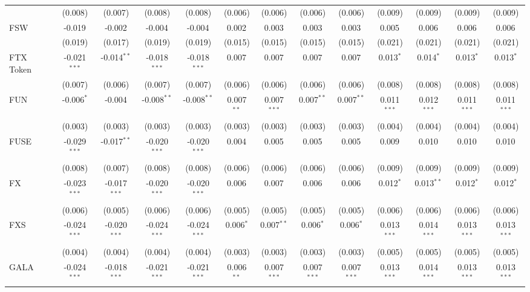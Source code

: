 \begin{table}[!htbp]
\begin{tabular}{@{\extracolsep{5pt}}lcccccccccccc}
  & (0.008) & (0.007) & (0.008) & (0.008) & (0.006) & (0.006) & (0.006) & (0.006) & (0.009) & (0.009) & (0.009) & (0.009) \\
 FSW & -0.019$^{}$ & -0.002$^{}$ & -0.004$^{}$ & -0.004$^{}$ & 0.002$^{}$ & 0.003$^{}$ & 0.003$^{}$ & 0.003$^{}$ & 0.005$^{}$ & 0.006$^{}$ & 0.006$^{}$ & 0.006$^{}$ \\
  & (0.019) & (0.017) & (0.019) & (0.019) & (0.015) & (0.015) & (0.015) & (0.015) & (0.021) & (0.021) & (0.021) & (0.021) \\
 FTX Token & -0.021$^{***}$ & -0.014$^{**}$ & -0.018$^{***}$ & -0.018$^{***}$ & 0.007$^{}$ & 0.007$^{}$ & 0.007$^{}$ & 0.007$^{}$ & 0.013$^{*}$ & 0.014$^{*}$ & 0.013$^{*}$ & 0.013$^{*}$ \\
  & (0.007) & (0.006) & (0.007) & (0.007) & (0.006) & (0.006) & (0.006) & (0.006) & (0.008) & (0.008) & (0.008) & (0.008) \\
 FUN & -0.006$^{*}$ & -0.004$^{}$ & -0.008$^{**}$ & -0.008$^{**}$ & 0.007$^{**}$ & 0.007$^{***}$ & 0.007$^{**}$ & 0.007$^{**}$ & 0.011$^{***}$ & 0.012$^{***}$ & 0.011$^{***}$ & 0.011$^{***}$ \\
  & (0.003) & (0.003) & (0.003) & (0.003) & (0.003) & (0.003) & (0.003) & (0.003) & (0.004) & (0.004) & (0.004) & (0.004) \\
 FUSE & -0.029$^{***}$ & -0.017$^{**}$ & -0.020$^{***}$ & -0.020$^{***}$ & 0.004$^{}$ & 0.005$^{}$ & 0.005$^{}$ & 0.005$^{}$ & 0.009$^{}$ & 0.010$^{}$ & 0.010$^{}$ & 0.010$^{}$ \\
  & (0.008) & (0.007) & (0.008) & (0.008) & (0.006) & (0.006) & (0.006) & (0.006) & (0.009) & (0.009) & (0.009) & (0.009) \\
 FX & -0.023$^{***}$ & -0.017$^{***}$ & -0.020$^{***}$ & -0.020$^{***}$ & 0.006$^{}$ & 0.007$^{}$ & 0.006$^{}$ & 0.006$^{}$ & 0.012$^{*}$ & 0.013$^{**}$ & 0.012$^{*}$ & 0.012$^{*}$ \\
  & (0.006) & (0.005) & (0.006) & (0.006) & (0.005) & (0.005) & (0.005) & (0.005) & (0.006) & (0.006) & (0.006) & (0.006) \\
 FXS & -0.024$^{***}$ & -0.020$^{***}$ & -0.024$^{***}$ & -0.024$^{***}$ & 0.006$^{*}$ & 0.007$^{**}$ & 0.006$^{*}$ & 0.006$^{*}$ & 0.013$^{***}$ & 0.014$^{***}$ & 0.013$^{***}$ & 0.013$^{***}$ \\
  & (0.004) & (0.004) & (0.004) & (0.004) & (0.003) & (0.003) & (0.003) & (0.003) & (0.005) & (0.005) & (0.005) & (0.005) \\
 GALA & -0.024$^{***}$ & -0.018$^{***}$ & -0.021$^{***}$ & -0.021$^{***}$ & 0.006$^{**}$ & 0.007$^{***}$ & 0.007$^{***}$ & 0.007$^{***}$ & 0.013$^{***}$ & 0.014$^{***}$ & 0.013$^{***}$ & 0.013$^{***}$ \\

\end{tabular}
\end{table}

